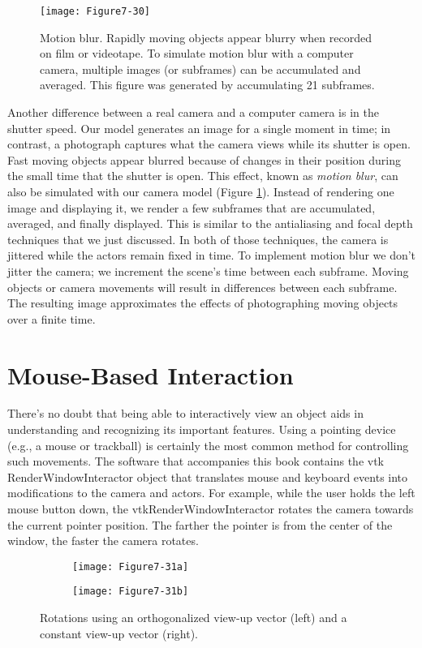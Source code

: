 \begin{figure}[!htb]
	\centering
	\texttt{[image: Figure7-30]}\\
	\caption{Motion blur. Rapidly moving objects appear blurry when recorded on film or videotape. To simulate motion blur with a computer camera, multiple images (or subframes) can be accumulated and averaged. This figure was generated by accumulating 21 subframes.}\label{fig:Figure7-30}
\end{figure}


Another difference between a real camera and a computer camera is in the shutter speed. Our model generates an image for a single moment in time; in contrast, a photograph captures what the camera views while its shutter is open. Fast moving objects appear blurred because of changes in their position during the small time that the shutter is open. This effect, known as \emph{motion blur}, can also be simulated with our camera model (Figure \ref{fig:Figure7-30}). Instead of rendering one image and displaying it, we render a few subframes that are accumulated, averaged, and finally displayed. This is similar to the antialiasing and focal depth techniques that we just discussed. In both of those techniques, the camera is jittered while the actors remain fixed in time. To implement motion blur we don't jitter the camera; we increment the scene's time between each subframe. Moving objects or camera movements will result in differences between each subframe. The resulting image approximates the effects of photographing moving objects over a finite time.

\section{Mouse-Based Interaction}

There's no doubt that being able to interactively view an object aids in understanding and recognizing its important features. Using a pointing device (e.g., a mouse or trackball) is certainly the most common method for controlling such movements. The software that accompanies this book contains the vtk RenderWindowInteractor object that translates mouse and keyboard events into modifications to the camera and actors. For example, while the user holds the left mouse button down, the vtkRenderWindowInteractor rotates the camera towards the current pointer position. The farther the pointer is from the center of the window, the faster the camera rotates.

\begin{figure}[!htb]
	\centering
	\begin{subfigure}{0.48\linewidth}
		\centering
		\texttt{[image: Figure7-31a]}
		\caption*{}\label{fig:Figure7-31a}
	\end{subfigure}
	\hfill
	\begin{subfigure}{0.48\linewidth}
		\centering
		\texttt{[image: Figure7-31b]}
		\caption*{}\label{fig:Figure7-31b}
	\end{subfigure}%
	\caption{Rotations using an orthogonalized view-up vector (left) and a constant view-up vector (right).}
	\label{fig:Figure7-31}
\end{figure}

